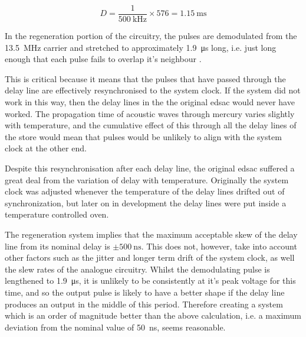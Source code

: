 \newcommand{\nominalLongTubeDelayMs}{1.15}

\begin{equation}
	D = \frac{1}{\SI{500}{\kilo\hertz}} \times 576 = \SI{\nominalLongTubeDelayMs}{\milli\second}  \label{eq:nom-delay}
\end{equation}


In the regeneration portion of the circuitry, the pulses are demodulated from the \SI{13.5}{\mega\hertz} carrier and stretched to approximately \SI{1.9}{\micro\second} long, i.e. just long enough that each pulse fails to overlap it's neighbour \cite[p.212]{wilkes1948}.

This is critical because it means that the pulses that have passed through the delay line are effectively resynchronised to the system clock. If the system did not work in this way, then the delay lines in the the original \gls{edsac} would never have worked. The propagation time of acoustic waves through mercury varies slightly with temperature, and the cumulative effect of this through all the delay lines of the store would mean that pulses would be unlikely to align with the system clock at the other end.

Despite this resynchronisation after each delay line, the original \gls{edsac} suffered a great deal from the variation of delay with temperature. Originally the system clock was adjusted whenever the temperature of the delay lines drifted out of synchronization, but later on in development the delay lines were put inside a temperature controlled oven.

\newcommand{\maxJitterPlusSkewNs}{50} %

The regeneration system implies that the maximum acceptable skew of the delay line from its nominal delay is $\pm\SI{500}{\nano\second}$. This does not, however, take into account other factors such as the jitter and longer term drift of the system clock, as well the slew rates of the analogue circuitry. Whilst the demodulating pulse is lengthened to \SI{1.9}{\micro\second}, it is unlikely to be consistently at it's peak voltage for this time, and so the output pulse is likely to have a better shape if the delay line produces an output in the middle of this period. Therefore creating a system which is an order of magnitude better than the above calculation, i.e. a maximum deviation from the nominal value of \SI{\maxJitterPlusSkewNs}{\nano\second}, seems reasonable.

